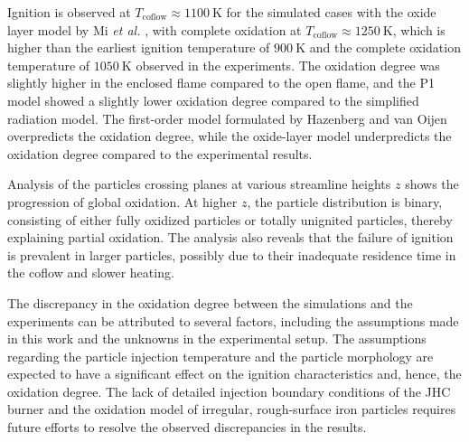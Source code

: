 \documentclass[twocolumn,9pt]{article} %
\newcommand{\mrm}[1]{\mathrm{#1}}
\renewcommand{\section}%
              [1]%
              {%
               \bgroup%
               \flushleft%
               \small\bf%
               \refstepcounter{section}%
               \arabic{section}. #1%
               \par%
               \egroup%
              }%
\begin{document}
Ignition is observed at $T_\mrm{coflow} \approx \SI{1100}{\kelvin}$ for the simulated cases with the oxide layer model by Mi \emph{et al.} \cite{Mi2022}, with complete oxidation at $T_\mrm{coflow}\approx\SI{1250}{\kelvin}$, which is higher than the earliest ignition temperature of $\SI{900}{\kelvin}$ and the complete oxidation temperature of $\SI{1050}{\kelvin}$ observed in the experiments. The oxidation degree was slightly higher in the enclosed flame compared to the open flame, and the P1 model showed a slightly lower oxidation degree compared to the simplified radiation model. The first-order model formulated by Hazenberg and van Oijen \cite{Hazenberg} overpredicts the oxidation degree, while the oxide-layer model underpredicts the oxidation degree compared to the experimental results.

Analysis of the particles crossing planes at various streamline heights $z$ shows the progression of global oxidation. At higher $z$, the particle distribution is binary, consisting of either fully oxidized particles or totally unignited particles, thereby explaining partial oxidation. The analysis also reveals that the failure of ignition is prevalent in larger particles, possibly due to their inadequate residence time in the coflow and slower heating.

The discrepancy in the oxidation degree between the simulations and the experiments can be attributed to several factors, including the assumptions made in this work and the unknowns in the experimental setup. The assumptions regarding the particle injection temperature and the particle morphology are expected to have a significant effect on the ignition characteristics and, hence, the oxidation degree. The lack of detailed injection boundary conditions of the JHC burner and the oxidation model of irregular, rough-surface iron particles requires future efforts to resolve the observed discrepancies in the results.



\end{document}
